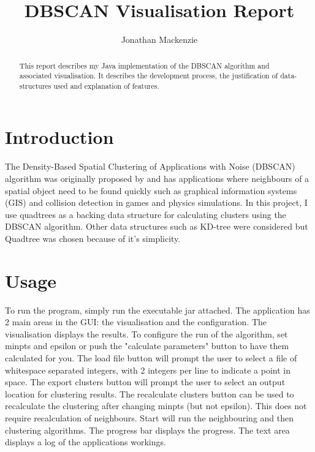\documentclass{CRPITStyle}
\renewcommand{\cite}{\citep}
\begin{document}
\title{DBSCAN Visualisation Report}
\author{Jonathan Mackenzie}

\maketitle

\begin{abstract}
This report describes my Java implementation of the DBSCAN algorithm and associated visualisation. It describes the development process, the justification of data-structures used and explanation of features.
\end{abstract}
\vspace{.1in}

\section{Introduction}
The Density-Based Spatial Clustering of Applications with Noise (DBSCAN) algorithm was originally proposed by \cite{Ester96adensity-based} and has applications where neighbours of a spatial object need to be found quickly such as graphical information systems (GIS) and collision detection in games and physics simulations. In this project, I use quadtrees as a backing data structure for calculating clusters using the DBSCAN algorithm. Other data structures such as KD-tree were considered but Quadtree was chosen because of it's simplicity.

\section{Usage}
To run the program, simply run the executable jar attached. The application has 2 main areas in the GUI: the visualisation and the configuration. The visualisation displays the results. To configure the run of the algorithm, set minpts and epsilon or push the "calculate parameters" button to have them calculated for you. The load file button will prompt the user to select a file of whitespace separated integers, with 2 integers per line to indicate a point in space. The export clusters button will prompt the user to select an output location for clustering results. The recalculate clusters button can be used to recalculate the clustering after changing minpts (but not epsilon). This does not require recalculation of neighbours. Start will run the neighbouring and then clustering algorithms. The progress bar displays the progress. The text area displays a log of the applications workings.
\end{document}
